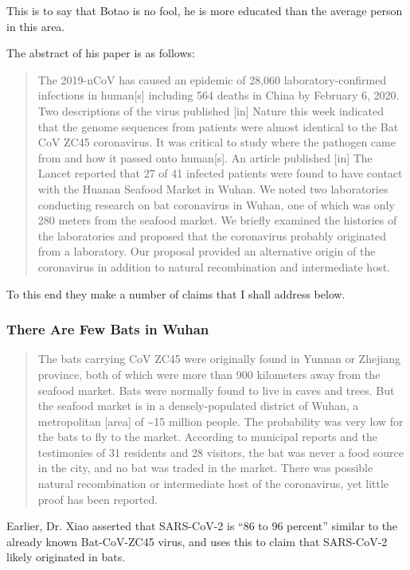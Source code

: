 \documentclass[11pt]{article}
\begin{document}
This is to say that Botao is no fool, he is more educated than the average person in this area.

The abstract of his paper is as follows:
\begin{quote}
The 2019-nCoV has caused an epidemic of 28,060 laboratory-confirmed infections in human[s] including 564 deaths in China by February 6, 2020. Two descriptions of the virus published [in] Nature this week indicated that the genome sequences from patients were almost identical to the Bat CoV ZC45 coronavirus. It was critical to study where the pathogen came from and how it passed onto human[s]. An article published [in] The Lancet reported that 27 of 41 infected patients were found to have contact with the Huanan Seafood Market in Wuhan. We noted two laboratories conducting research on bat coronavirus in Wuhan, one of which was only 280 meters from the seafood market. We briefly examined the histories of the laboratories and proposed that the coronavirus probably originated from a laboratory. Our proposal provided an alternative origin of the coronavirus in addition to natural recombination and intermediate host.
\end{quote}
To this end they make a number of claims that I shall address below.

\subsubsection{There Are Few Bats in Wuhan}
\label{sec:org0bf86b6}
\begin{quote}
The bats carrying CoV ZC45 were originally found in Yunnan or Zhejiang province, both of which were more than 900 kilometers away from the seafood market. Bats were normally found to live in caves and trees. But the seafood market is in a densely-populated district of Wuhan, a metropolitan [area] of \textasciitilde{}15 million people. The probability was very low for the bats to fly to the market. According to municipal reports and the testimonies of 31 residents and 28 visitors, the bat was never a food source in the city, and no bat was traded in the market. There was possible natural recombination or intermediate host of the coronavirus, yet little proof has been reported.
\end{quote}

Earlier, Dr. Xiao asserted that SARS-CoV-2 is ``86 to 96 percent'' similar to the already known Bat-CoV-ZC45 virus, and uses this to claim that SARS-CoV-2 likely originated in bats.
\end{document}
